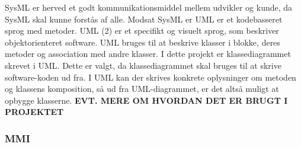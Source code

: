 \newline
SysML er herved et godt kommunikationsmiddel mellem udvikler og kunde, da SysML skal kunne forstås af alle. 
\newline
Modsat SysML er UML er et kodebasseret sprog med metoder.
UML (2) er et specifikt og visuelt sprog, som beskriver objektorienteret software. UML bruges til at beskrive klasser i blokke, deres metoder og association med andre klasser. I dette projekt er klassediagrammet skrevet i UML. Dette er valgt, da klassediagrammet skal bruges til at skrive software-koden ud fra. I UML kan der skrives konkrete oplysninger om metoden og klassens komposition, så ud fra UML-diagrammet, er det altså muligt at opbygge klasserne. \textbf{EVT. MERE OM HVORDAN DET ER BRUGT I PROJEKTET}


\subsubsection{MMI}